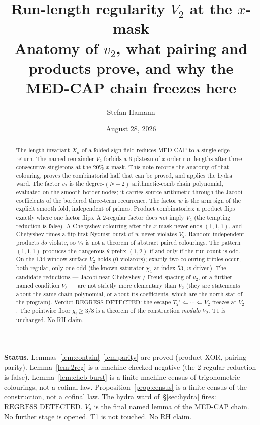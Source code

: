 \documentclass[11pt]{article}
\title{\bfseries Run-length regularity $V_2$ at the $x$-mask\\[2mm]
\large Anatomy of $v_2$, what pairing and products prove,
and why the MED-CAP chain freezes here}
\author{Stefan Hamann}
\date{August 28, 2026}
\theoremstyle{remark}
\begin{document}
\maketitle

\begin{abstract}\noindent
The length invariant $X_n$ of a folded sign field reduces MED-CAP
to a single edge-return.  The named remainder $V_2$ forbids a
$6$-plateau of $x$-order run lengths after three consecutive
singletons at the $20\%$ $x$-mask.  This note records the anatomy
of that colouring, proves the combinatorial half that can be
proved, and applies the hydra ward.  The factor $v_2$ is the
degree-$(N-2)$ arithmetic-comb chain polynomial, evaluated on the
smooth-border nodes; it carries source arithmetic through the
Jacobi coefficients of the bordered three-term recurrence.  The
factor $w$ is the arm sign of the explicit smooth fold, independent
of primes.  Product combinatorics: a product flips exactly where one factor
flips.  A $2$-regular factor does \emph{not} imply $V_2$ (the
tempting reduction is false).  A Chebyshev colouring
after the $x$-mask never ends $(1,1,1)$, and Chebyshev times a
flip-first Nyquist burst of $w$ never violates $V_2$.  Random
independent products \emph{do} violate, so $V_2$ is not a theorem
of abstract paired colourings.  The pattern $(1,1,1)$ produces the
dangerous $\theta$-prefix $(1,2)$ if and only if the run count is
odd.  On the $134$-window surface $V_2$ holds ($0$ violators);
exactly two colouring triples occur, both regular, only one odd
(the known saturator $\chi_4$ at index $53$, $w$-driven).  The
candidate reductions --- Jacobi-near-Chebyshev / Freud spacing of
$v_2$, or a further named condition $V_3$ --- are not strictly
more elementary than $V_2$ (they are statements about the same
chain polynomial, or about its coefficients, which are the north
star of the program).  Verdict $\mathrm{REGRESS\_DETECTED}$: the
escape $T_2'\Leftarrow\cdots\Leftarrow V_2$ freezes at $V_2$.
The pointwise floor $g_i\ge 3/8$ is a theorem of the construction
\emph{modulo} $V_2$.  T1 is unchanged.  No RH claim.
\end{abstract}

\medskip\noindent
\textbf{Status.}\enspace
Lemmas~\ref{lem:contain}--\ref{lem:parity} are proved
(product XOR, pairing parity).
Lemma~\ref{lem:2reg} is a machine-checked negative
(the $2$-regular reduction is false).
Lemma~\ref{lem:cheb-burst} is a finite machine census of
trigonometric colourings, not a cofinal law.
Proposition~\ref{prop:census} is a finite census of the
construction, not a cofinal law.
The hydra ward of~\S\ref{sec:hydra} fires:
$\mathrm{REGRESS\_DETECTED}$.  $V_2$ is the final named lemma of
the MED-CAP chain.  No further stage is opened.
T1 is not touched.  No RH claim.
\end{document}

